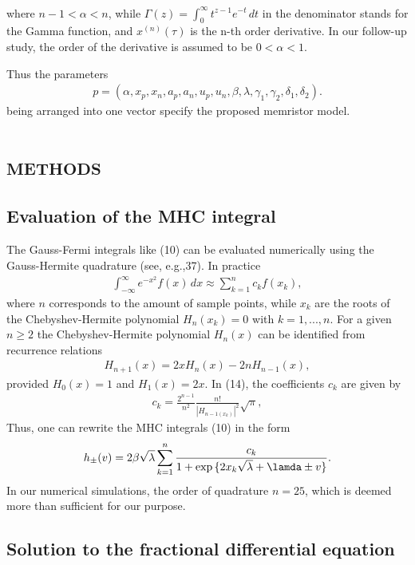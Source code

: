\documentclass{article}
\begin{document}
{\begin{multicols}{2}
\begin{align}
\end{align}
where $n-1<\alpha<n$, while $\Gamma (z)= \int_0^\infty t^{z-1} e^{-t} \,dt$ in the denominator stands for the Gamma function, and $x^{(n)} (\tau)$ is the n-th order derivative. In our follow-up study, the order of the derivative is assumed to be $0 < \alpha < 1$. \par
Thus the parameters
\begin{align}
    p = (\alpha, x_p, x_n, a_p, a_n, u_p, u_n, \beta, \lambda, \gamma _1, \gamma _2, \delta_1, \delta_2).
\end{align}
being arranged into one vector specify the proposed memristor model.
{\centering %
\section{\scshape methods}
}
{\centering \subsection{Evaluation of the MHC integral}}
The Gauss-Fermi integrals like (10) can be evaluated
numerically using the Gauss-Hermite quadrature (see,
e.g.,37). In practice
\begin{align}
    \int_{- \infty}^\infty e^{-x^2} f(x) \,dx \approx \sum_{k=1}^n c_k f(x_k),
\end{align}
where $n$ corresponds to the amount of sample points, while $x_k$ are the roots of the Chebyshev-Hermite polynomial $H_n (x_k) = 0$ with $k=1,...,n$. For a given $n \ge 2$ the Chebyshev-Hermite polynomial $H_n (x)$ can be identified
from recurrence relations
\begin{align}
    H_{n+1}(x) = 2xH_n(x) - 2nH_{n-1}(x),
\end{align}
provided $H_0(x)=1$ and $H_1(x) = 2x$. In (14), the coefficients $c_k$ are given by
\begin{align}
    c_k = \frac{2^{n-1}}{n^2} \frac{n!}{|H_{n-1 (x_k)}|^2} \sqrt{\pi},
\end{align}
Thus, one can rewrite the MHC integrals (10) in the form
\begin{align}
    h_{\pm}(v)=2 \beta \sqrt{\lambda} \sum_{k=1}^n \frac{c_k}{1+\exp{\{2x_k \sqrt{\lambda} + \lamda \pm v\}}}.
\end{align}
In our numerical simulations, the order of quadrature
$n = 25$, which is deemed more than sufficient for our purpose.
{\centering \subsection{Solution to the fractional differential equation}}

\end{multicols}}
\end{document}
